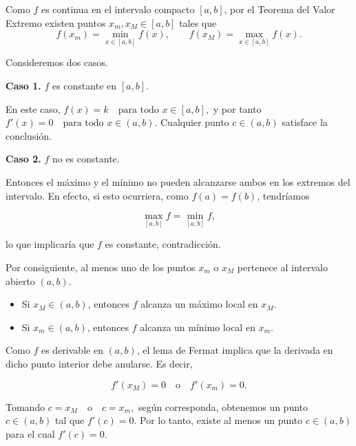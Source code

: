 \begin{prueba}
    Como $f$ es continua en el intervalo compacto $[a,b]$, por el
Teorema del Valor Extremo existen puntos $x_m,x_M\in[a,b]$ tales que
\[
f(x_m)=\min_{x\in[a,b]}f(x),
\qquad
f(x_M)=\max_{x\in[a,b]}f(x).
\]

Consideremos dos casos.

\medskip

\noindent
\textbf{Caso 1.} $f$ es constante en $[a,b]$.

En este caso, $f(x)=k \quad \text{para todo } x\in[a,b],$ y por tanto $f'(x)=0 \quad \text{para todo } x\in(a,b).$ Cualquier punto $c\in(a,b)$ satisface la conclusión.

\medskip

\noindent
\textbf{Caso 2.} $f$ no es constante.

Entonces el máximo y el mínimo no pueden alcanzarse ambos en los
extremos del intervalo. En efecto, si esto ocurriera, como
$f(a)=f(b)$, tendríamos

\[
\max_{[a,b]}f=\min_{[a,b]}f,
\]

lo que implicaría que $f$ es constante, contradicción.

Por consiguiente, al menos uno de los puntos $x_m$ o $x_M$
pertenece al intervalo abierto $(a,b)$.

\begin{itemize}
    \item Si $x_M\in(a,b)$, entonces $f$ alcanza un máximo local en
    $x_M$.
    \item Si $x_m\in(a,b)$, entonces $f$ alcanza un mínimo local en
    $x_m$.
\end{itemize}

Como $f$ es derivable en $(a,b)$, el lema de Fermat implica que la
derivada en dicho punto interior debe anularse. Es decir,

\[
f'(x_M)=0
\quad\text{o}\quad
f'(x_m)=0.
\]

Tomando $c=x_M
\quad\text{o}\quad
c=x_m,$ según corresponda, obtenemos un punto $c\in(a,b)$ tal que $f'(c)=0.$ Por lo tanto, existe al menos un punto $c\in(a,b)$ para el cual
$f'(c)=0$.
\end{prueba}

